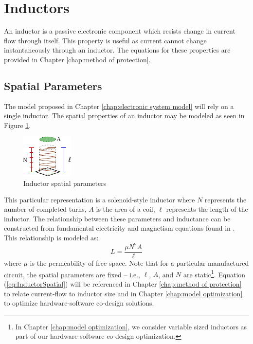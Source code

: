 \documentclass[11pt,compsoc,oneside]{report}
\begin{document}
\section{Inductors}
An inductor is a passive electronic component which resists change in current flow through itself. This property is useful as current cannot change instantaneously through an inductor. The equations for these properties are provided in Chapter \ref{chap:method of protection}.
\subsection{Spatial Parameters}
The model proposed in Chapter \ref{chap:electronic system model} will rely on a single inductor. The spatial properties of an inductor may be modeled as seen in Figure \ref{fig:InductorParams}.
\begin{figure}
	\centering
    \includegraphics[width=0.25\linewidth]{img/Inductor_Parameters.pdf}
    \caption{Inductor spatial parameters}
    \label{fig:InductorParams}
\end{figure}
This particular representation is a solenoid-style inductor where $N$ represents the number of completed turns, $A$ is the area of a coil, $\ell$ represents the length of the inductor. The relationship between these parameters and inductance can be constructed from fundamental electricity and magnetism equations found in \cite{uniphy}. This relationship is modeled as:
\begin{equation}\label{eq:InductorSpatial}
L = \frac{\mu N^{2}A}{\ell}
\end{equation}
where $\mu$ is the permeability of free space. Note that for a particular manufactured circuit, the spatial parameters are fixed -- i.e., $\ell$, $A$, and $N$ are static\footnote{In Chapter \ref{chap:model optimization}, we consider variable sized inductors as part of our hardware-software co-design optimization.}. Equation (\ref{eq:InductorSpatial}) will be referenced in Chapter \ref{chap:method of protection} to relate current-flow to inductor size and in Chapter \ref{chap:model optimization} to optimize hardware-software co-design solutions.
\end{document}
